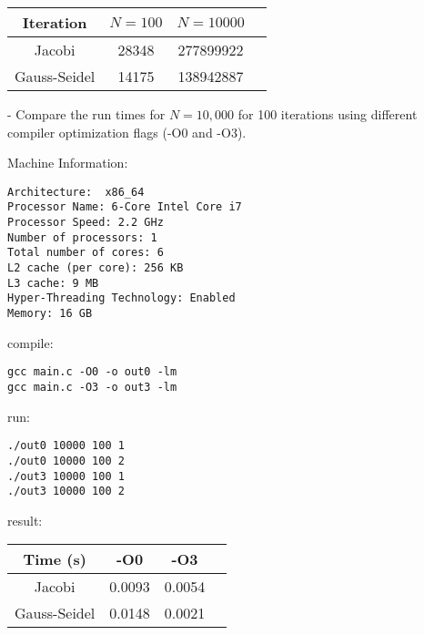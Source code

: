 \documentclass[titlepage]{article}
\begin{document}
\begin{tabular}{ |c|c|c|c| } 
        \hline
        Iteration & $N=100$ & $N=10000$ \\
        \hline
        Jacobi & 28348  & 277899922 \\
        \hline
        Gauss-Seidel & 14175  & 138942887 \\
        \hline
\end{tabular}

\newpage
- Compare the run times for $N = 10, 000$ for 100 iterations 
using different compiler optimization flags (-O0 and -O3).

Machine Information:
\begin{verbatim}
Architecture:  x86_64
Processor Name: 6-Core Intel Core i7
Processor Speed: 2.2 GHz 
Number of processors: 1 
Total number of cores: 6 
L2 cache (per core): 256 KB 
L3 cache: 9 MB 
Hyper-Threading Technology: Enabled    
Memory: 16 GB 
\end{verbatim}

compile:
\begin{verbatim}
gcc main.c -O0 -o out0 -lm
gcc main.c -O3 -o out3 -lm
\end{verbatim}

run:
\begin{verbatim}
./out0 10000 100 1
./out0 10000 100 2
./out3 10000 100 1
./out3 10000 100 2
\end{verbatim}

result:

\begin{tabular}{ |c|c|c|c| } 
\hline
Time (s) & -O0 & -O3 \\
\hline
Jacobi & 0.0093  & 0.0054 \\
\hline
Gauss-Seidel & 0.0148  & 0.0021 \\
\hline
\end{tabular}
\end{document}
